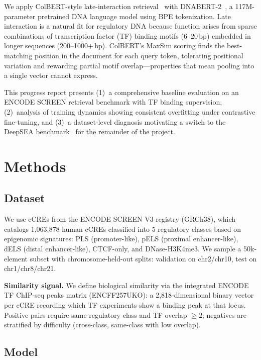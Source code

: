 \documentclass[10pt,twocolumn]{article}
\begin{document}
We apply ColBERT-style late-interaction retrieval~\citep{khattab2020colbert} with DNABERT-2~\citep{zhou2023dnabert2}, a 117M-parameter pretrained DNA language model using BPE tokenization. Late interaction is a natural fit for regulatory DNA because function arises from sparse combinations of transcription factor (TF) binding motifs (6--20\,bp) embedded in longer sequences (200--1000+\,bp). ColBERT's MaxSim scoring finds the best-matching position in the document for each query token, tolerating positional variation and rewarding partial motif overlap---properties that mean pooling into a single vector cannot express.

This progress report presents (1)~a comprehensive baseline evaluation on an ENCODE SCREEN retrieval benchmark with TF binding supervision, (2)~analysis of training dynamics showing consistent overfitting under contrastive fine-tuning, and (3)~a dataset-level diagnosis motivating a switch to the DeepSEA benchmark~\citep{zhou2015deepsea} for the remainder of the project.

\section{Methods}
\label{sec:methods}

\subsection{Dataset}
\label{sec:dataset}

We use cCREs from the ENCODE SCREEN V3 registry (GRCh38), which catalogs 1,063,878 human cCREs classified into 5 regulatory classes based on epigenomic signatures: PLS (promoter-like), pELS (proximal enhancer-like), dELS (distal enhancer-like), CTCF-only, and DNase-H3K4me3. We sample a 50k-element subset with chromosome-held-out splits: validation on chr2/chr10, test on chr1/chr8/chr21.

\textbf{Similarity signal.}
We define biological similarity via the integrated ENCODE TF ChIP-seq peaks matrix (ENCFF257UKO): a 2,818-dimensional binary vector per cCRE recording which TF experiments show a binding peak at that locus. Positive pairs require same regulatory class and TF overlap $\geq 2$; negatives are stratified by difficulty (cross-class, same-class with low overlap).

\subsection{Model}
\label{sec:model}
\end{document}
